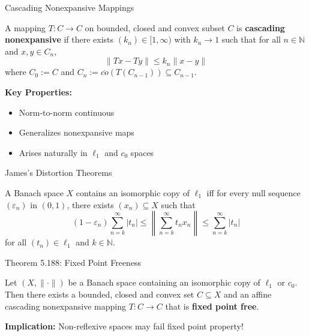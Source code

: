 \documentclass[aspectratio=169,10pt]{beamer}
\begin{document}
\begin{frame}{Cascading Nonexpansive Mappings}
  \begin{definition}
    A mapping $T: C \to C$ on bounded, closed and convex subset $C$ is
    \textbf{cascading nonexpansive} if there exists $(k_n) \in [1, \infty)$ with
    $k_n \to 1$ such that for all $n \in \mathbb{N}$ and $x, y \in C_n$,
    \[\|Tx - Ty\| \leq k_n \|x - y\|\]
    where $C_0 := C$ and $C_n := \overline{co}(T(C_{n-1})) \subseteq C_{n-1}$.
  \end{definition}

  \vspace{0.2cm}

  \textbf{Key Properties:}
  \begin{itemize}
    \item Norm-to-norm continuous
    \item Generalizes nonexpansive maps
    \item Arises naturally in $\ell_1$ and $c_0$ spaces
  \end{itemize}
\end{frame}

\begin{frame}{James's Distortion Theorems}
  \begin{theorem}
    A Banach space $X$ contains an isomorphic copy of $\ell_1$ iff for every
    null sequence $(\varepsilon_n)$ in $(0, 1)$, there exists $(x_n) \subseteq X$ such that
    \[(1 - \varepsilon_n) \sum_{n=k}^{\infty} |t_n| \leq \left\|\sum_{n=k}^{\infty} t_n x_n\right\|
    \leq \sum_{n=k}^{\infty} |t_n|\]
    for all $(t_n) \in \ell_1$ and $k \in \mathbb{N}$.
  \end{theorem}
\end{frame}

\begin{frame}{Theorem 5.188: Fixed Point Freeness}
  \begin{theorem}[Theorem 5.188]
    Let $(X, \|\cdot\|)$ be a Banach space containing an isomorphic copy of
    $\ell_1$ or $c_0$. Then there exists a bounded, closed and convex set $C \subseteq X$
    and an affine cascading nonexpansive mapping $T: C \to C$ that is
    \textbf{fixed point free}.
  \end{theorem}

  \vspace{0.3cm}

  \textbf{Implication:} Non-reflexive spaces may fail fixed point property!
\end{frame}
\end{document}
